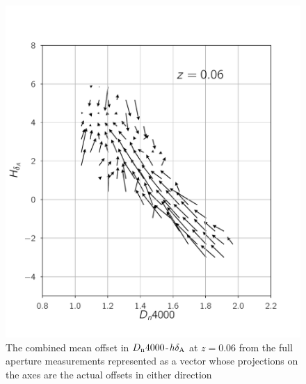 \begin{figure}
\includegraphics[width=\textwidth]{figures/quiver_b.pdf}
\caption[ The combined mean offset in $D_{\rm n}4000$-$h\delta_{\rm A}$ at $z=0.06$ from the full aperture measurements represented as a vector whose projections on the axes are the actual offsets in either direction ]{ The combined mean offset in $D_{\rm n}4000$-$h\delta_{\rm A}$ at $z=0.06$ from the full aperture measurements represented as a vector whose projections on the axes are the actual offsets in either direction
\label{fig:offset_quiver2}}
\end{figure}

